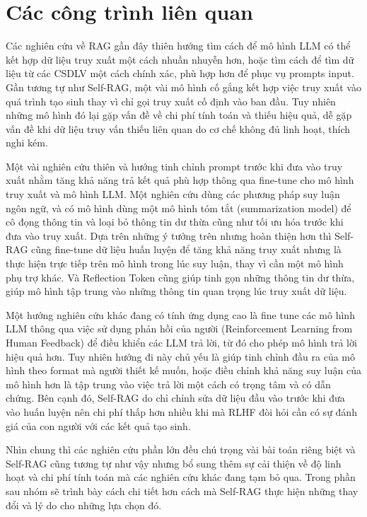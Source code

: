 \documentclass{article}
\begin{document}
\section{Các công trình liên quan}
Các nghiên cứu về RAG gần đây thiên hướng tìm cách để mô hình LLM có thể kết hợp dữ liệu truy xuất một cách nhuần nhuyễn hơn, hoặc tìm cách để tìm dữ liệu từ các CSDLV một cách chính xác, phù hợp hơn để phục vụ prompts input. Gần tương tự như Self-RAG, một vài mô hình cố gắng kết hợp việc truy xuất vào quá trình tạo sinh thay vì chỉ gọi truy xuất cố định vào ban đầu. Tuy nhiên những mô hình đó lại gặp vấn đề về chi phí tính toán và thiếu hiệu quả, dễ gặp vấn đề khi dữ liệu truy vấn thiếu liên quan do cơ chế không đủ linh hoạt, thích nghi kém. 

Một vài nghiên cứu thiên và hướng tinh chỉnh prompt trước khi đưa vào truy xuất nhằm tăng khả năng trả kết quả phù hợp thông qua fine-tune cho mô hình truy xuất và mô hình LLM. Một nghiên cứu dùng các phương pháp suy luận ngôn ngữ, và có mô hình dùng một mô hình tóm tắt (summarization model) để cô đọng thông tin và loại bỏ thông tin dư thừa cũng như tối ưu hóa trước khi đưa vào truy xuất. Dựa trên những ý tưởng trên nhưng hoàn thiện hơn thì Self-RAG cũng fine-tune dữ liệu huấn luyện để tăng khả năng truy xuất nhưng là thực hiện trực tiếp trên mô hình trong lúc suy luận, thay vì cần một mô hình phụ trợ khác. Và Reflection Token cũng giúp tinh gọn những thông tin dư thừa, giúp mô hình tập trung vào những thông tin quan trọng lúc truy xuất dữ liệu. 

Một hướng nghiên cứu khác đang có tính ứng dụng cao là fine tune các mô hình LLM thông qua việc sử dụng phản hồi của người (Reinforcement Learning from Human Feedback) để điều khiển các LLM trả lời, từ đó cho phép mô hình trả lời hiệu quả hơn. Tuy nhiên hướng đi này chủ yếu là giúp tinh chỉnh đầu ra của mô hình theo format mà người thiết kế muốn, hoặc điều chỉnh khả năng suy luận của mô hình hơn là tập trung vào việc trả lời một cách có trọng tâm và có dẫn chứng. Bên cạnh đó, Self-RAG do chỉ chỉnh sửa dữ liệu đầu vào trước khi đưa vào huấn luyện nên chi phí thấp hơn nhiều khi mà RLHF đòi hỏi cần có sự đánh giá của con người với các kết quả tạo sinh.

Nhìn chung thì các nghiên cứu phần lớn đều chú trọng vài bài toán riêng biệt và Self-RAG cũng tương tự như vậy nhưng bổ sung thêm sự cải thiện về độ linh hoạt và chi phí tính toán mà các nghiên cứu khác đang tạm bỏ qua. Trong phần sau nhóm sẽ trình bày cách chi tiết hơn cách mà Self-RAG thực hiện những thay đổi và lý do cho những lựa chọn đó. 
\end{document}

